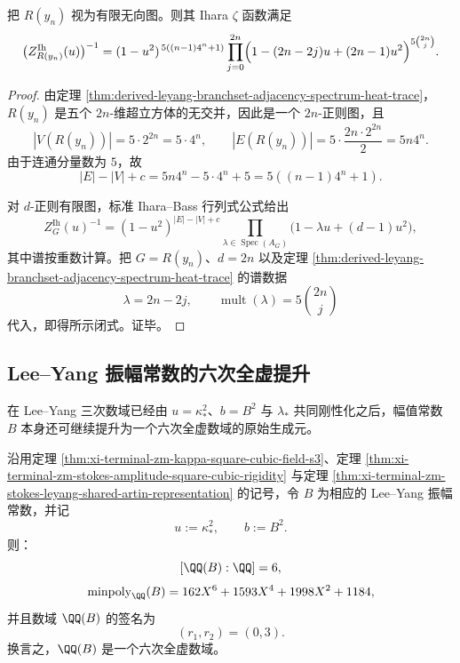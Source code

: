 \begin{theorem}\label{thm:derived-leyang-branchset-ihara-zeta}
把 \(R(y_n)\) 视为有限无向图。则其 Ihara \(\zeta\) 函数满足
\[
\bigl(Z^{\mathrm{Ih}}_{R(y_n)}(u)\bigr)^{-1}
=
(1-u^2)^{\,5((n-1)4^n+1)}
\prod_{j=0}^{2n}
\Bigl(1-(2n-2j)u+(2n-1)u^2\Bigr)^{5\binom{2n}{j}}.
\]
\end{theorem}

\begin{proof}
由定理 \ref{thm:derived-leyang-branchset-adjacency-spectrum-heat-trace}，\(R(y_n)\) 是五个 \(2n\)-维超立方体的无交并，因此是一个 \(2n\)-正则图，且
\[
|V(R(y_n))|=5\cdot 2^{2n}=5\cdot 4^n,
\qquad
|E(R(y_n))|
=
5\cdot \frac{2n\cdot 2^{2n}}{2}
=
5n4^n.
\]
由于连通分量数为 \(5\)，故
\[
|E|-|V|+c
=
5n4^n-5\cdot 4^n+5
=
5((n-1)4^n+1).
\]

对 \(d\)-正则有限图，标准 Ihara--Bass 行列式公式给出 \cite{TerrasZetaGraphs,StarkTerras1996GraphCoverings}
\[
Z_G^{\mathrm{Ih}}(u)^{-1}
=
(1-u^2)^{|E|-|V|+c}
\prod_{\lambda\in\operatorname{Spec}(A_G)}
\bigl(1-\lambda u+(d-1)u^2\bigr),
\]
其中谱按重数计算。把 \(G=R(y_n)\)、\(d=2n\) 以及定理 \ref{thm:derived-leyang-branchset-adjacency-spectrum-heat-trace} 的谱数据
\[
\lambda=2n-2j,
\qquad
\operatorname{mult}(\lambda)=5\binom{2n}{j}
\]
代入，即得所示闭式。证毕。
\end{proof}

\subsection{Lee--Yang 振幅常数的六次全虚提升}

在 Lee--Yang 三次数域已经由 \(u=\kappa_*^2\)、\(b=B^2\) 与 \(\lambda_*\) 共同刚性化之后，幅值常数 \(B\) 本身还可继续提升为一个六次全虚数域的原始生成元。

\begin{theorem}\label{thm:derived-leyang-amplitude-degree-signature}
沿用定理 \ref{thm:xi-terminal-zm-kappa-square-cubic-field-s3}、定理 \ref{thm:xi-terminal-zm-stokes-amplitude-square-cubic-rigidity} 与定理 \ref{thm:xi-terminal-zm-stokes-leyang-shared-artin-representation} 的记号，令 \(B\) 为相应的 Lee--Yang 振幅常数，并记
\[
u:=\kappa_*^2,
\qquad
b:=B^2.
\]
则：
\[
[\QQ(B):\QQ]=6,
\]
\[
\operatorname{minpoly}_{\QQ}(B)
=
162X^6+1593X^4+1998X^2+1184,
\]
并且数域 \(\QQ(B)\) 的签名为
\[
(r_1,r_2)=(0,3).
\]
换言之，\(\QQ(B)\) 是一个六次全虚数域。
\end{theorem}

